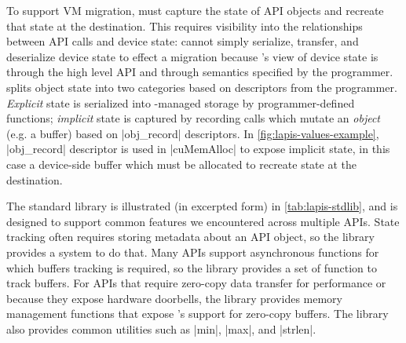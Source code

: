 { To support VM migration, \AvA must capture the state of API objects and recreate that state at the destination. This requires visibility into the relationships between API calls
and device state: \AvA cannot simply serialize, transfer, and deserialize device state to
effect a migration because \AvA's view of device state is through the high level API and through
semantics specified by the programmer.
\AvA splits object state into two categories based on descriptors from the \AvA programmer.
\emph{Explicit} state is serialized into \AvA-managed storage by programmer-defined functions;
\emph{implicit} state is captured by recording calls which mutate an \emph{object} (e.g. a buffer) based on \spec|obj_record| descriptors. In \autoref{fig:lapis-values-example}, \spec|obj_record| descriptor is used in
\spec|cuMemAlloc| to expose implicit state, in this case a device-side buffer which must be allocated to recreate state at the destination.

The \Lapis standard library is illustrated (in excerpted form) in \autoref{tab:lapis-stdlib},
and is designed to support common features we encountered across multiple APIs.
State tracking often requires storing metadata about an API object, so the library provides a system to do that.
Many APIs support asynchronous functions for which buffers tracking is required, so the library provides a set of function to track buffers.
For APIs that require zero-copy data transfer for performance or because they expose hardware doorbells, the library provides memory management functions that expose \AvA's support for zero-copy buffers.
The library also provides common utilities
such as \spec|min|, \spec|max|, and \spec|strlen|.





}

